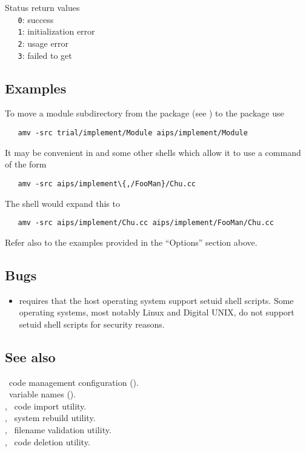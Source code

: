 Status return values
\\ \verb+   0+:  success
\\ \verb+   1+:  initialization error
\\ \verb+   2+:  usage error
\\ \verb+   3+:  failed to get 

\subsection*{Examples}

To move a module subdirectory from the  package (see ) to the  package use

\begin{verbatim}
   amv -src trial/implement/Module aips/implement/Module
\end{verbatim}

\noindent
It may be convenient in  and some other shells which allow it to
use a command of the form

\begin{verbatim}
   amv -src aips/implement\{,/FooMan}/Chu.cc
\end{verbatim}

\noindent
The shell would expand this to

\begin{verbatim}
   amv -src aips/implement/Chu.cc aips/implement/FooMan/Chu.cc
\end{verbatim}

\noindent
Refer also to the examples provided in the ``Options'' section above.

\subsection*{Bugs}

\begin{itemize}
\item
    requires that the host operating system support setuid
   shell scripts.  Some operating systems, most notably Linux and
   Digital UNIX, do not support setuid shell scripts for security
   reasons.
\end{itemize}

\subsection*{See also}

\aipspp\ code management configuration ().\\
\aipspp\ variable names ().\\
, \aipspp\ code import utility.\\
, \aipspp\ system rebuild utility.\\
, \aipspp\ filename validation utility.\\
, \aipspp\ code deletion utility.

